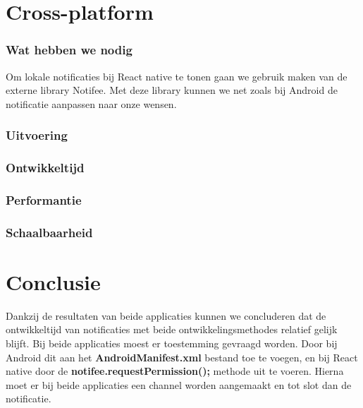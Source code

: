 

\clearpage
\section{Cross-platform}
\subsubsection{Wat hebben we nodig}
Om lokale notificaties bij React native te tonen gaan we gebruik maken van de externe library Notifee.
Met deze library kunnen we net zoals bij Android de notificatie aanpassen naar onze wensen.

\subsubsection{Uitvoering}



\subsubsection{Ontwikkeltijd}



\subsubsection{Performantie}



\subsubsection{Schaalbaarheid}



\section{Conclusie}
Dankzij de resultaten van beide applicaties kunnen we concluderen dat de ontwikkeltijd van notificaties met 
beide ontwikkelingsmethodes relatief gelijk blijft. Bij beide applicaties moest er toestemming gevraagd worden. 
Door bij Android dit aan het \textbf{AndroidManifest.xml} bestand toe te voegen, en bij React native door 
de \textbf{notifee.requestPermission();} methode uit te voeren. Hierna moet er bij beide applicaties een 
channel worden aangemaakt en tot slot dan de notificatie.

